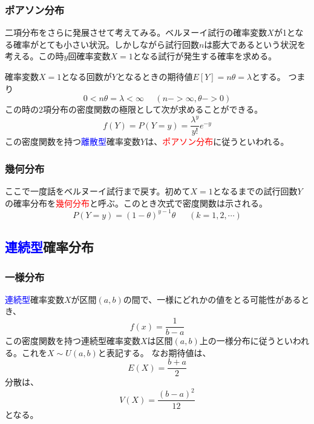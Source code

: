 \documentclass[a4paper,10pt]{jarticle}
\begin{document}
\subsubsection{ポアソン分布}
二項分布をさらに発展させて考えてみる。ベルヌーイ試行の確率変数$X$が1となる確率がとても小さい状況。しかしながら試行回数$n$は膨大であるという状況を考える。この時$y$回確率変数$X=1$となる試行が発生する確率を求める。

確率変数$X=1$となる回数が$Y$となるときの期待値$E[Y] = n\theta = \lambda$とする。
つまり
\begin{equation}
    0<n\theta = \lambda < \infty \ \ \ \ \ \ (n->\infty,\theta->0)\tag{3,4}
\end{equation}
この時の2項分布の密度関数の極限として次が求めることができる。
\begin{equation}
    f(Y) = P(Y = y)=\frac{\lambda^y}{y!}e^{-y}\tag{3,5}
\end{equation}
この密度関数を持つ\textcolor{blue}{離散型}確率変数$Y$は、\textcolor{red}{ポアソン分布}に従うといわれる。
\subsubsection{幾何分布}
ここで一度話をベルヌーイ試行まで戻す。初めて$X=1$となるまでの試行回数$Y$の確率分布を\textcolor{red}{幾何分布}と呼ぶ。このとき次式で密度関数は示される。
\begin{equation}
    P(Y=y) = (1-\theta)^{y-1}\theta\ \ \ \ \ \ \ (k=1,2,\cdots)\tag{3,6}
\end{equation}
\subsection{\textcolor{blue}{連続型}確率分布}
\subsubsection{一様分布}
\textcolor{blue}{連続型}確率変数$X$が区間$(a,b)$の間で、一様にどれかの値をとる可能性があるとき、
\begin{equation}
    f(x)=\frac{1}{b-a}\tag{3,7}
\end{equation}
この密度関数を持つ連続型確率変数$X$は区間$(a,b)$上の一様分布に従うといわれる。これを$X\sim U(a,b)$と表記する。
なお期待値は、
\begin{equation}
    E(X)=\frac{b+a}{2}\tag{3,8}
\end{equation}
分散は、
\begin{equation}
    V(X)=\frac{(b-a)^2}{12}\tag{3,9}
\end{equation}
となる。
\end{document}
